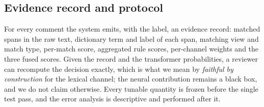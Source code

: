 \subsection{Evidence record and protocol}
\label{sec:evidence}

For every comment the system emits, with the label, an evidence record: matched
spans in the raw text, dictionary term and label of each span, matching view and
match type, per-match score, aggregated rule scores, per-channel weights and the
three fused scores. Given the record and the transformer probabilities, a reviewer
can recompute the decision exactly, which is what we mean by \emph{faithful by
construction} for the lexical channel; the neural contribution remains a black box,
and we do not claim otherwise. Every tunable quantity is frozen before the single test
pass, and the error analysis is descriptive and performed after it.
